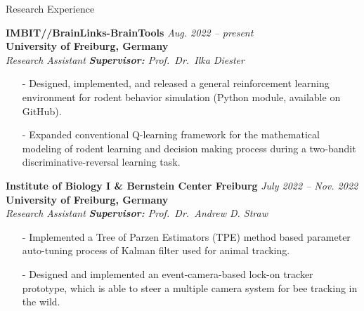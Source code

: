 \begin{rSection}{Research Experience}
    
    {\bf IMBIT//BrainLinks-BrainTools} \hfill {\em Aug. 2022 -- present}
    \\{\bf University of Freiburg, Germany}
    \\{\it Research Assistant} \hfill {\textit{\textbf{Supervisor:} Prof.\ Dr.\ Ilka Diester}}
    \begin{itemize}
        \item[-] Designed, implemented, and released a general reinforcement learning environment for rodent behavior simulation (Python module, available on GitHub).
        \item[-] Expanded conventional Q-learning framework for the mathematical modeling of rodent learning and decision making process during a two-bandit discriminative-reversal learning task.
    \end{itemize}
    
    {\bf Institute of Biology I \& Bernstein Center Freiburg} \hfill {\em July 2022 -- Nov. 2022}
    \\{\bf University of Freiburg, Germany}
    \\{\it Research Assistant} \hfill {\textit{\textbf{Supervisor:} Prof.\ Dr.\ Andrew D. Straw}}
    \begin{itemize}
        \item[-] Implemented a Tree of Parzen Estimators (TPE) method based parameter auto-tuning process of Kalman filter used for animal tracking.
        \item[-] Designed and implemented an event-camera-based lock-on tracker prototype, which is able to steer a multiple camera system for bee tracking in the wild. 
    \end{itemize}
        

\end{rSection}
